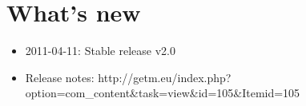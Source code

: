 \section{What's new}

\begin{itemize}
   \item{2011-04-11: Stable release v2.0}
   \item{Release notes: http://getm.eu/index.php?option=com\_content\&task=view\&id=105\&Itemid=105}
\end{itemize}
